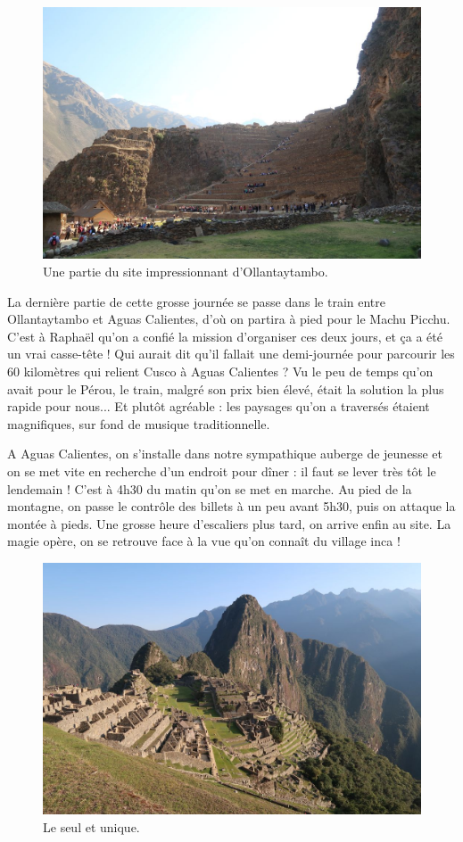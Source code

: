 \begin{figure}
\centering
\includegraphics{images/20180911_ollantaytambo.JPG}
\caption{Une partie du site impressionnant d'Ollantaytambo.}
\end{figure}

La dernière partie de cette grosse journée se passe dans le train entre
Ollantaytambo et Aguas Calientes, d'où on partira à pied pour le Machu
Picchu. C'est à Raphaël qu'on a confié la mission d'organiser ces deux
jours, et ça a été un vrai casse-tête ! Qui aurait dit qu'il fallait une
demi-journée pour parcourir les 60 kilomètres qui relient Cusco à Aguas
Calientes ? Vu le peu de temps qu'on avait pour le Pérou, le train,
malgré son prix bien élevé, était la solution la plus rapide pour
nous... Et plutôt agréable : les paysages qu'on a traversés étaient
magnifiques, sur fond de musique traditionnelle.

A Aguas Calientes, on s'installe dans notre sympathique auberge de
jeunesse et on se met vite en recherche d'un endroit pour dîner : il
faut se lever très tôt le lendemain ! C'est à 4h30 du matin qu'on se met
en marche. Au pied de la montagne, on passe le contrôle des billets à un
peu avant 5h30, puis on attaque la montée à pieds. Une grosse heure
d'escaliers plus tard, on arrive enfin au site. La magie opère, on se
retrouve face à la vue qu'on connaît du village inca !

\begin{figure}
\centering
\includegraphics{images/20180911_machupicchu.JPG}
\caption{Le seul et unique.}
\end{figure}

